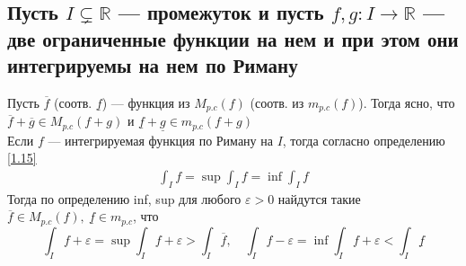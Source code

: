 \documentclass[a4paper]{article}
\begin{document}
\subsection{Пусть $I\subsetneq\mathbb{R}$ — промежуток и пусть $f,g:I\rightarrow\mathbb{R}$ — две ограниченные функции на нем и при этом они интегрируемы на нем по Риману}
Пусть $\overline{f}$ (соотв. $\underline{f}$) — функция из $M_{p.c}(f)$ (соотв. из $m_{p.c}(f)$). Тогда ясно, что $\overline{f}+\overline{g}\in M_{p.c}(f+g)$ и $\underline{f}+\underline{g}\in m_{p.c}(f+g)$\\[2mm]
\indent Если $f$ — интегрируемая функция по Риману на $I$, тогда согласно определению \ref{1.15}
$$\begin{aligned}
    \int_I f=\sup\int_I f=\inf\int_I f
\end{aligned}$$
Тогда по определению inf, sup для любого $\varepsilon>0$ найдутся такие $\overline{f}\in M_{p.c}(f),\ \underline{f}\in m_{p.c}$, что 
\begin{equation}\label{6.3.1}
    \int_I f+\varepsilon=\sup\int_I f + \varepsilon > \int_I \overline{f},\quad
    \int_I f-\varepsilon=\inf\int_I f + \varepsilon < \int_I \underline{f}
\end{equation}
\end{document}
